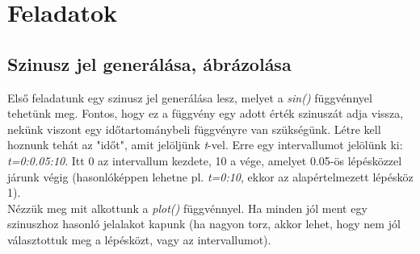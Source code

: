 \documentclass[12pt,a4paper]{article}
\begin{document}
\section{Feladatok}

\subsection{Szinusz jel generálása, ábrázolása}
Első feladatunk egy szinusz jel generálása lesz, melyet a \textit{sin()} függvénnyel tehetünk meg. Fontos, hogy ez a függvény egy adott érték szinuszát adja vissza, nekünk viszont egy időtartománybeli függvényre van szükségünk. Létre kell hoznunk tehát az "időt", amit jelöljünk \textit{t}-vel. Erre egy intervallumot jelölünk ki: \textit{t=0:0.05:10}. Itt 0 az intervallum kezdete, 10 a vége, amelyet 0.05-ös lépésközzel járunk végig (hasonlóképpen lehetne pl. \textit{t=0:10}, ekkor az alapértelmezett lépésköz 1).\\
Nézzük meg mit alkottunk a \textit{plot()} függvénnyel. Ha minden jól ment egy szinuszhoz hasonló jelalakot kapunk (ha nagyon torz, akkor lehet, hogy nem jól választottuk meg a lépésközt, vagy az intervallumot).
\end{document}
